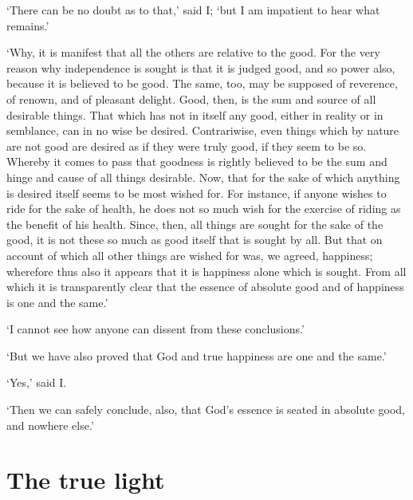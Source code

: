 \documentclass[12pt]{book}
\begin{document}
`There can be no doubt as to that,' said I; `but I am impatient to hear
what remains.'

`Why, it is manifest that all the others are relative to the good. For
the very reason why independence is sought is that it is judged good,
and so power also, because it is believed to be good. The same, too, may
be supposed of reverence, of renown, and of pleasant delight. Good,
then, is the sum and source of all desirable things. That which has not
in itself any good, either in reality or in semblance, can in no wise be
desired. Contrariwise, even things which by nature are not good are
desired as if they were truly good, if they seem to be so. Whereby it
comes to pass that goodness is rightly believed to be the sum and hinge
and cause of all things desirable. Now, that for the sake of which
anything is desired itself seems to be most wished for. For instance, if
anyone wishes to ride for the sake of health, he does not so much wish
for the exercise of riding as the benefit of his health. Since, then,
all things are sought for the sake of the good, it is not these so much
as good itself that is sought by all. But that on account of which all
other things are wished for was, we agreed, happiness; wherefore thus
also it appears that it is happiness alone which is sought. From all
which it is transparently clear that the essence of absolute good and of
happiness is one and the same.'

`I cannot see how anyone can dissent from these conclusions.'

`But we have also proved that God and true happiness are one and the
same.'

`Yes,' said I.

`Then we can safely conclude, also, that God's essence is seated in
absolute good, and nowhere else.'



\section{The true light}
\end{document}
